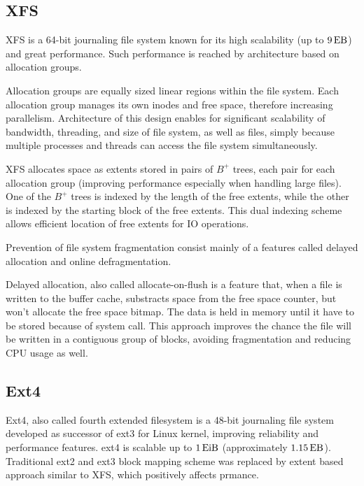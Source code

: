 \documentclass[
  color, %
  table, %
  lof,   %
  lot,   %
]{fithesis3}
\begin{document}

\subsection{XFS}
XFS is a 64-bit journaling file system known for its high scalability (up to $\SI{9}{\exa\byte}$) and great performance. Such performance is reached by architecture based on allocation groups.

Allocation groups are equally sized linear regions within the file system. Each allocation group manages its own inodes and free space, therefore increasing parallelism. Architecture of this design enables for significant scalability of bandwidth, threading, and size of file system, as well as files, simply because multiple processes and threads can access the file system simultaneously.

XFS allocates space as extents stored in pairs of $B^+$ trees, each pair for each allocation group (improving performance especially when handling large files). One of the $B^+$ trees is indexed by the length of the free extents, while the other is indexed by the starting block of the free extents. This dual indexing scheme allows efficient location of free extents for IO operations.

Prevention of file system fragmentation consist mainly of a features called delayed allocation and online defragmentation.

Delayed allocation, also called allocate-on-flush is a feature that, when a file is written to the buffer cache, substracts space from the free space counter, but won't allocate the free space bitmap. The data is held in memory until it have to be stored because of system call. This approach improves the chance the file will be written in a contiguous group of blocks, avoiding fragmentation and reducing CPU usage as well.

\subsection{Ext4}
Ext4, also called fourth extended filesystem is a 48-bit journaling file system developed as successor of ext3 for Linux kernel, improving reliability and performance features. ext4 is scalable up to $\SI{1}{\exbi\byte}$ (approximately $\SI{1.15}{\exa\byte}$). Traditional ext2 and ext3 block mapping scheme was replaced by extent based approach similar to XFS, which positively affects prmance.
\end{document}
